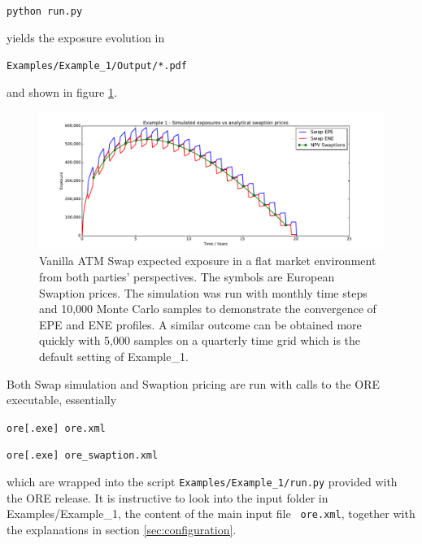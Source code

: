 \documentclass[12pt, a4paper]{article}
\begin{document}
{\medskip
\centerline{\tt python run.py } 
\medskip

yields the exposure evolution in 

\medskip
\centerline{\tt Examples/Example\_1/Output/*.pdf } 
\medskip

and shown in figure \ref{fig_1}. 
\begin{figure}[h!]
\begin{center}
\includegraphics[scale=0.45]{mpl_swap_1_1m_sbb_10k_flat.pdf}
\end{center}
\caption{Vanilla ATM Swap expected exposure in a flat market environment from both parties' perspectives. The symbols are European Swaption prices. The simulation was run with monthly time steps and 10,000 Monte Carlo samples to demonstrate the convergence of EPE and ENE profiles. A similar
outcome can be obtained more quickly with 5,000 samples on a quarterly time grid which is the default setting of Example\_1. }
\label{fig_1}
\end{figure}
Both Swap simulation and Swaption pricing are run with calls to the ORE executable, essentially 

\medskip
\centerline{\tt ore[.exe] ore.xml} 

\centerline{\tt ore[.exe] ore\_swaption.xml} 
\medskip

which are wrapped into the script {\tt Examples/Example\_1/run.py} provided with the ORE release.
It is instructive to look into the input folder in Examples/Example\_1, the content of the main input file {\tt
  ore.xml}, together with the explanations in section \ref{sec:configuration}. \\

}
\end{document}
